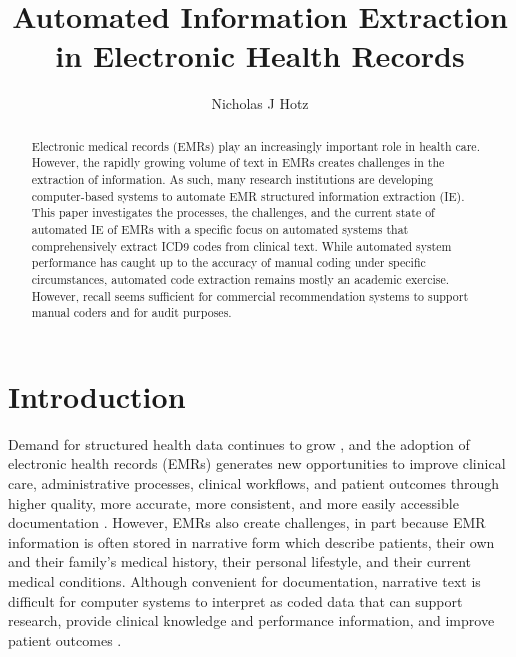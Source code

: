 \documentclass[sigconf]{acmart}
\begin{document}
\title{Automated Information Extraction in Electronic Health Records}

\author{Nicholas J Hotz}

\begin{abstract}
Electronic medical records (EMRs) play an increasingly important role in health care. However, the rapidly growing volume of text in EMRs creates challenges in the extraction of information. As such, many research institutions are developing computer-based systems to automate EMR structured information extraction (IE). This paper investigates the processes, the challenges, and the current state of automated IE of EMRs with a specific focus on automated systems that comprehensively extract ICD9 codes from clinical text. While automated system performance has caught up to the accuracy of manual coding under specific circumstances, automated code extraction remains mostly an academic exercise. However, recall seems sufficient for commercial recommendation systems to support manual coders and for audit purposes. 
\end{abstract}



\maketitle

\section{Introduction}
Demand for structured health data  continues to grow \cite{stanfill2010systematic}, and the adoption of electronic health records (EMRs) generates new opportunities to improve clinical care, administrative processes, clinical workflows, and patient outcomes through higher quality, more accurate, more consistent, and more easily accessible documentation \cite{meystre2008extracting}\cite{pons2016natural}. However, EMRs also create challenges, in part because EMR information is often stored in narrative form which describe patients, their own and their family's medical history, their personal lifestyle, and their current medical conditions. \cite{meystre2008extracting} Although convenient for documentation, narrative text is difficult for computer systems to interpret as coded data that can support research, provide clinical knowledge and performance information, and improve patient outcomes \cite{stanfill2010systematic}\cite{meystre2008extracting}.
\end{document}
